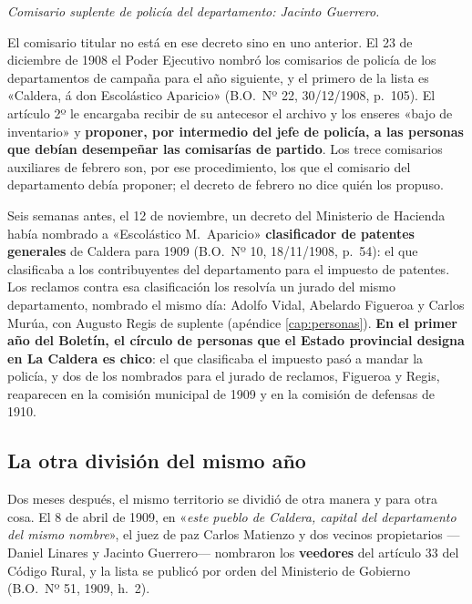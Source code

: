 \textit{Comisario suplente de policía del departamento: Jacinto Guerrero.}

El comisario titular no está en ese decreto sino en uno anterior. El 23 de diciembre de 1908
el Poder Ejecutivo nombró los comisarios de policía de los departamentos de campaña para el año
siguiente, y el primero de la lista es «Caldera, á don Escolástico Aparicio» (B.O.\ Nº 22,
30/12/1908, p.\ 105). El artículo 2º le encargaba recibir de su antecesor el archivo y los enseres
«bajo de inventario» y \textbf{proponer, por intermedio del jefe de policía, a las personas que debían
desempeñar las comisarías de partido}. Los trece comisarios auxiliares de febrero son, por ese
procedimiento, los que el comisario del departamento debía proponer; el decreto de febrero no dice
quién los propuso.

Seis semanas antes, el 12 de noviembre, un decreto del Ministerio de Hacienda había nombrado a
«Escolástico M.\ Aparicio» \textbf{clasificador de patentes generales} de Caldera para 1909 (B.O.\
Nº 10, 18/11/1908, p.\ 54): el que clasificaba a los contribuyentes del departamento para el
impuesto de patentes. Los reclamos contra esa clasificación los resolvía un jurado del mismo
departamento, nombrado el mismo día: Adolfo Vidal, Abelardo Figueroa y Carlos Murúa, con
Augusto Regis de suplente (apéndice \ref{cap:personas}). \textbf{En el primer año del Boletín, el círculo de personas que el
Estado provincial designa en La Caldera es chico}: el que clasificaba el impuesto pasó a mandar
la policía, y dos de los nombrados para el jurado de reclamos, Figueroa y Regis, reaparecen en la
comisión municipal de 1909 y en la comisión de defensas de 1910.

\subsection*{La otra división del mismo año}

Dos meses después, el mismo territorio se dividió de otra manera y para otra cosa. El 8 de abril
de 1909, en «\textit{este pueblo de Caldera, capital del departamento del mismo nombre}», el juez
de paz Carlos Matienzo\index{Matienzo, Carlos} y dos vecinos propietarios ---Daniel
Linares\index{Linares, Daniel} y Jacinto Guerrero\index{Guerrero, Jacinto}--- nombraron los
\textbf{veedores} del artículo 33 del Código Rural, y la lista se publicó por orden del
Ministerio de Gobierno (B.O.\ Nº 51, 1909, h.\ 2).

